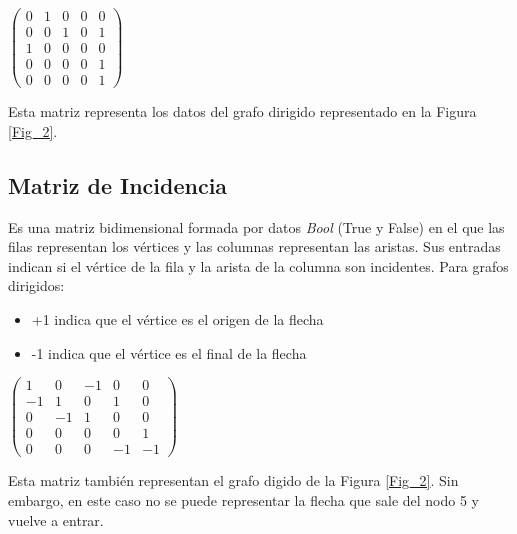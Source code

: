 \documentclass[11pt]{article}
\theoremstyle{plain}
\begin{document}
            \begin{center}
                $\begin{pmatrix} 
                    0 & 1 & 0 & 0 & 0\\
                    0 & 0 & 1 & 0 & 1\\
                    1 & 0 & 0 & 0 & 0\\
                    0 & 0 & 0 & 0 & 1\\
                    0 & 0 & 0 & 0 & 1    
                \end{pmatrix}$ 
            \end{center}
            Esta matriz representa los datos del grafo dirigido representado en la Figura \ref{Fig_2}.
        \subsection{Matriz de Incidencia} %
        \label{sub:matriz_de_incidencia}
            Es una matriz bidimensional formada por datos \textit{Bool} (True y False) en el que las filas representan los vértices y las columnas representan las aristas. Sus entradas indican si el vértice de la fila y la arista de la columna son incidentes. Para grafos dirigidos:
            \begin{itemize}
                \item +1 indica que el vértice es el origen de la flecha
                \item -1 indica que el vértice es el final de la flecha
            \end{itemize}
            \begin{center}
                $\begin{pmatrix} 
                    1 & 0 & -1 & 0 & 0\\
                    -1 & 1 & 0 & 1 & 0\\
                    0 & -1 & 1 & 0 & 0\\
                    0 & 0 & 0 & 0 & 1\\
                    0 & 0 & 0 & -1 & -1    
                \end{pmatrix}$ 
            \end{center}
            Esta matriz también representan el grafo digido de la Figura \ref{Fig_2}. Sin embargo, en este caso no se puede representar la flecha que sale del nodo 5 y vuelve a entrar.         
\end{document}

